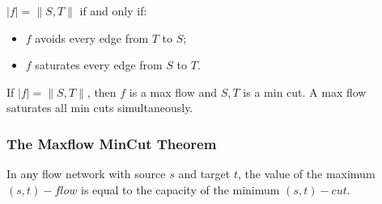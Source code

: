 \observation

$|f| = \|S,T\|$ if and only if:
\begin{itemize}
    \item $f$ avoids every edge from $T$ to $S$;
    \item $f$ saturates every edge from $S$ to $T$.
\end{itemize}

If $|f| = \|S,T\|$, then  $f$ is a max flow and $S,T$ is a min cut.
A max flow saturates all min cuts simultaneously.

\subsubsection{The Maxflow MinCut Theorem}
\begin{theorem}
    In any flow network with source $s$ and target $t$,
    the value of the maximum $(s,t)-flow$ is equal to
    the capacity of the minimum $(s,t)-cut$.
\end{theorem}

